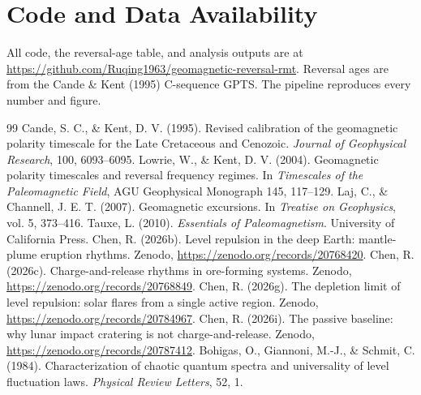 \documentclass[12pt,a4paper]{article}
\begin{document}
\section*{Code and Data Availability}
All code, the reversal-age table, and analysis outputs are at \url{https://github.com/Ruqing1963/geomagnetic-reversal-rmt}. Reversal ages are from the Cande \& Kent (1995) C-sequence GPTS. The pipeline reproduces every number and figure.

\begin{thebibliography}{99}
\small
{} Cande, S. C., \& Kent, D. V. (1995). Revised calibration of the geomagnetic polarity timescale for the Late Cretaceous and Cenozoic. \emph{Journal of Geophysical Research}, 100, 6093--6095.
 Lowrie, W., \& Kent, D. V. (2004). Geomagnetic polarity timescales and reversal frequency regimes. In \emph{Timescales of the Paleomagnetic Field}, AGU Geophysical Monograph 145, 117--129.
 Laj, C., \& Channell, J. E. T. (2007). Geomagnetic excursions. In \emph{Treatise on Geophysics}, vol. 5, 373--416.
 Tauxe, L. (2010). \emph{Essentials of Paleomagnetism}. University of California Press.
 Chen, R. (2026b). Level repulsion in the deep Earth: mantle-plume eruption rhythms. Zenodo, \url{https://zenodo.org/records/20768420}.
 Chen, R. (2026c). Charge-and-release rhythms in ore-forming systems. Zenodo, \url{https://zenodo.org/records/20768849}.
 Chen, R. (2026g). The depletion limit of level repulsion: solar flares from a single active region. Zenodo, \url{https://zenodo.org/records/20784967}.
 Chen, R. (2026i). The passive baseline: why lunar impact cratering is not charge-and-release. Zenodo, \url{https://zenodo.org/records/20787412}.
 Bohigas, O., Giannoni, M.-J., \& Schmit, C. (1984). Characterization of chaotic quantum spectra and universality of level fluctuation laws. \emph{Physical Review Letters}, 52, 1.
\end{thebibliography}
\end{document}
